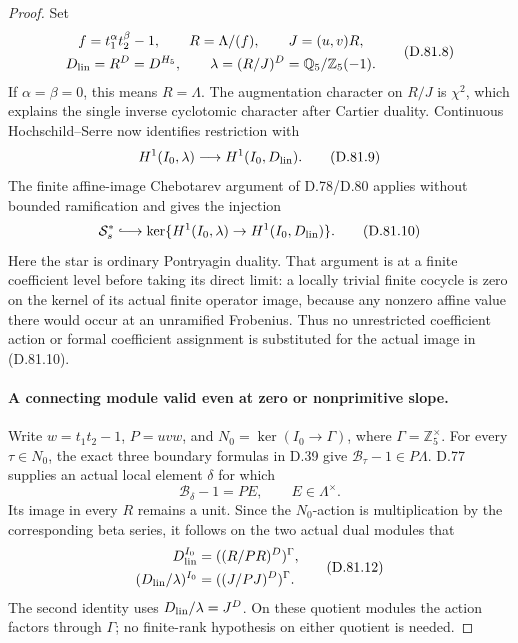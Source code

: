 \begin{proof}
Set
\[
 \begin{gathered}
 f=t_1^\alpha t_2^\beta-1,\qquad R=\Lambda/(f),\qquad
 J=(u,v)R,\\
 D_{\rm lin}=R^D=D^{H_5},\qquad
 \lambda=(R/J)^D=\mathbb Q_5/\mathbb Z_5(-1).
 \end{gathered}                                               \tag{D.81.8}
\]
If \(\alpha=\beta=0\), this means \(R=\Lambda\).
The augmentation character on \(R/J\) is \(\chi^2\), which
explains the single inverse cyclotomic character after Cartier duality.
Continuous Hochschild--Serre now identifies restriction with
\[
 H^1(I_0,\lambda)\longrightarrow H^1(I_0,D_{\rm lin}).
                                                               \tag{D.81.9}
\]
The finite affine-image Chebotarev argument of D.78/D.80 applies
without bounded ramification and gives the injection
\[
 \mathcal S_s^*\lhook\joinrel\longrightarrow
 \ker\{H^1(I_0,\lambda)\to H^1(I_0,D_{\rm lin})\}.
                                                               \tag{D.81.10}
\]
Here the star is ordinary Pontryagin duality. That argument is
at a finite coefficient level before taking its direct limit:
a locally trivial finite cocycle is zero on the kernel of its
actual finite operator image, because any nonzero affine value
there would occur at an unramified Frobenius. Thus no unrestricted
coefficient action or formal coefficient assignment is substituted
for the actual image in (D.81.10).

\paragraph{A connecting module valid even at zero or nonprimitive slope.}
Write \(w=t_1t_2-1\), \(P=uvw\), and
\(N_0=\ker(I_0\to\Gamma)\), where \(\Gamma=\mathbb Z_5^\times\).
For every \(\tau\in N_0\), the exact three boundary formulas in
D.39 give
\(\mathcal B_\tau-1\in P\Lambda\).
D.77 supplies an actual local element \(\delta\) for which
\[
              \mathcal B_\delta-1=P E,\qquad
                                  E\in\Lambda^\times. \tag{D.81.11}
\]
Its image in every \(R\) remains a unit. Since the \(N_0\)-action
is multiplication by the corresponding beta series, it follows
on the two actual dual modules that
\[
 \begin{split}
 D_{\rm lin}^{I_0}&=((R/PR)^D)^\Gamma,\\
 (D_{\rm lin}/\lambda)^{I_0}&=((J/PJ)^D)^\Gamma.
 \end{split}                                                 \tag{D.81.12}
\]
The second identity uses \(D_{\rm lin}/\lambda=J^D\).
On these quotient modules the action factors through \(\Gamma\);
no finite-rank hypothesis on either quotient is needed.


\end{proof}
